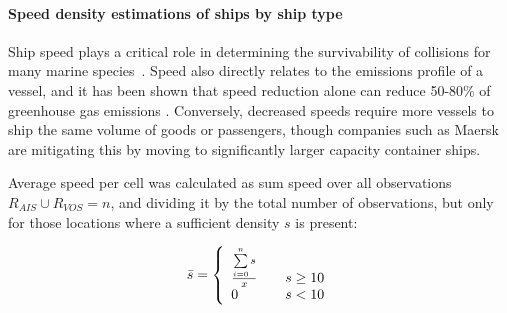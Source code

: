 \paragraph{Speed density estimations of ships by ship type}

Ship speed plays a critical role in determining the survivability of collisions for many marine species~\citep{Vanderlaan2009}. Speed also directly relates to the emissions profile of a vessel, and it has been shown that speed reduction alone can reduce 50-80\% of greenhouse gas emissions \cite{lack2011impact}. Conversely, decreased speeds require more vessels to ship the same volume of goods or passengers, though companies such as Maersk are mitigating this by moving to significantly larger capacity container ships. 

Average speed per cell was calculated as sum speed over all observations $R_{AIS} \cup R_{VOS} = n$, and dividing it by the total number of observations, but only for those locations where a sufficient density $s$ is present: 

\begin{equation}
 \bar{s} = \left\{
   \begin{array}{l l}
    \frac{\sum\limits_{i=0}^n s}{x} & \quad \text{$s \ge 10$}\\
    0 & \quad \text {$s < 10$}
   \end{array}\right.
\end{equation}





